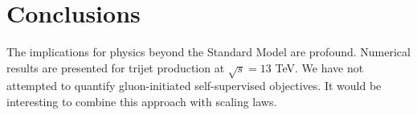 \section{Conclusions}\label{sec:conclusions}

The implications for physics beyond the Standard Model are profound.
Numerical results are presented for trijet production at $\sqrt{s} = 13$
TeV. We have not attempted to quantify gluon-initiated self-supervised
objectives. It would be interesting to combine this approach with
scaling laws.

